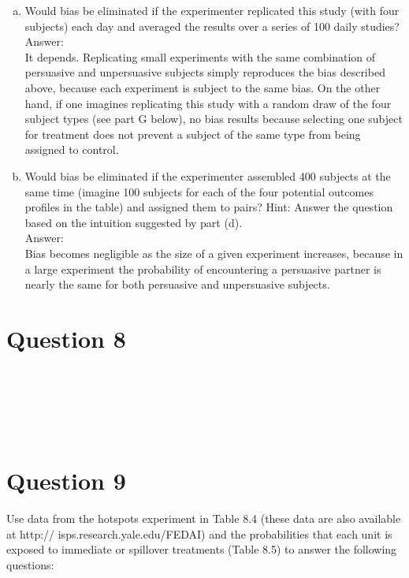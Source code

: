 \documentclass[11pt,notitlepage]{article}\usepackage[]{graphicx}\usepackage[]{color}
\makeatletter
\newenvironment{kframe}{%
 \def\at@end@of@kframe{}%
 \ifinner\ifhmode%
  \def\at@end@of@kframe{\end{minipage}}%
  \begin{minipage}{\columnwidth}%
 \fi\fi%
 \def\FrameCommand##1{\hskip\@totalleftmargin \hskip-\fboxsep
 \colorbox{shadecolor}{##1}\hskip-\fboxsep
     \hskip-\linewidth \hskip-\@totalleftmargin \hskip\columnwidth}%
 \MakeFramed {\advance\hsize-\width
   \@totalleftmargin\z@ \linewidth\hsize
   \@setminipage}}%
 {\par\unskip\endMakeFramed%
 \at@end@of@kframe}
\newenvironment{knitrout}{}{} %
\makeatother
\begin{document}
\begin{enumerate}[a)]
\item Would bias be eliminated if the experimenter replicated this study (with four subjects) each day and averaged the results over a series of 100 daily studies? \\
Answer:\\
It depends. Replicating small experiments with the same combination of persuasive and unpersuasive subjects simply reproduces the bias described above, because each experiment is subject to the same bias.  On the other hand, if one imagines replicating this study with a random draw of the four subject types (see part G below), no bias results because selecting one subject for treatment does not prevent a subject of the same type from being assigned to control.
\item Would bias be eliminated if the experimenter assembled 400 subjects at the same time (imagine 100 subjects for each of the four potential outcomes profiles in the table) and assigned them to pairs? Hint: Answer the question based on the intuition suggested by part (d). \\
Answer:\\
Bias becomes negligible as the size of a given experiment increases, because in a large experiment the probability of encountering a persuasive partner is nearly the same for both persuasive and unpersuasive subjects.
\end{enumerate}

\section*{Question 8}
\begin{knitrout}
\color{fgcolor}\begin{kframe}
\begin{verbatim}






\end{verbatim}
\end{kframe}
\end{knitrout}



\section*{Question 9}
Use data from the hotspots experiment in Table 8.4 (these data are also available at http:// isps.research.yale.edu/FEDAI) and the probabilities that each unit is exposed to immediate or spillover treatments (Table 8.5) to answer the following questions:
\end{document}
